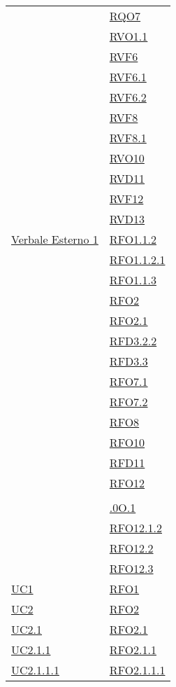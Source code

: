 \begin{longtable}{|>{\centering}m{5cm}|m{5cm}<{\centering}|}
& \hyperlink{RQO7}{RQO7}\\
& \hyperlink{RVO1.1}{RVO1.1}\\
& \hyperlink{RVF6}{RVF6}\\
& \hyperlink{RVF6.1}{RVF6.1}\\
& \hyperlink{RVF6.2}{RVF6.2}\\
& \hyperlink{RVF8}{RVF8}\\
& \hyperlink{RVF8.1}{RVF8.1}\\
& \hyperlink{RVO10}{RVO10}\\
& \hyperlink{RVD11}{RVD11}\\
& \hyperlink{RVF12}{RVF12}\\
& \hyperlink{RVD13}{RVD13}\\ \hline
\hyperlink{Verbale Esterno 1}{Verbale Esterno 1} & \hyperlink{RFO1.1.2}{RFO1.1.2}\\
& \hyperlink{RFO1.1.2.1}{RFO1.1.2.1}\\
& \hyperlink{RFO1.1.3}{RFO1.1.3}\\
& \hyperlink{RFO2}{RFO2}\\
& \hyperlink{RFO2.1}{RFO2.1}\\
& \hyperlink{RFD3.2.2}{RFD3.2.2}\\
& \hyperlink{RFD3.3}{RFD3.3}\\
& \hyperlink{RFO7.1}{RFO7.1}\\
& \hyperlink{RFO7.2}{RFO7.2}\\
& \hyperlink{RFO8}{RFO8}\\
& \hyperlink{RFO10}{RFO10}\\
& \hyperlink{RFD11}{RFD11}\\
& \hyperlink{RFO12}{RFO12}\\
& \hyperlink{}{}\\
& \hyperlink{.0O.1}{.0O.1}\\
& \hyperlink{RFO12.1.2}{RFO12.1.2}\\
& \hyperlink{RFO12.2}{RFO12.2}\\
& \hyperlink{RFO12.3}{RFO12.3}\\ \hline
\hyperref[UC1]{UC1} & \hyperlink{RFO1}{RFO1}\\ \hline
\hyperref[UC2]{UC2} & \hyperlink{RFO2}{RFO2}\\ \hline
\hyperref[UC2.1]{UC2.1} & \hyperlink{RFO2.1}{RFO2.1}\\ \hline
\hyperref[UC2.1.1]{UC2.1.1} & \hyperlink{RFO2.1.1}{RFO2.1.1}\\ \hline
\hyperref[UC2.1.1.1]{UC2.1.1.1} & \hyperlink{RFO2.1.1.1}{RFO2.1.1.1}\\

\end{longtable}
